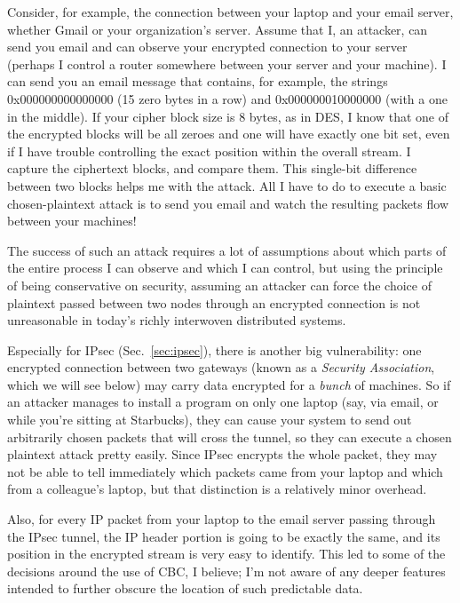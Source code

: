 \documentclass[%
 aip,
 jmp,%
 amsmath,amssymb,
 reprint,%
]{revtex4-1}
\begin{document}
Consider, for example, the connection between your laptop and your
email server, whether Gmail or your organization's server.  Assume
that I, an attacker, can send you email and can observe your encrypted
connection to your server (perhaps I control a router somewhere
between your server and your machine).  I can send you an email
message that contains, for example, the strings 0x000000000000000 (15
zero bytes in a row) and 0x000000010000000 (with a one in the middle).
If your cipher block size is 8 bytes, as in DES, I know that one of
the encrypted blocks will be all zeroes and one will have exactly one
bit set, even if I have trouble controlling the exact position within
the overall stream.  I capture the ciphertext blocks, and compare
them.  This single-bit difference between two blocks helps me with the
attack.  All I have to do to execute a basic chosen-plaintext attack
is to send you email and watch the resulting packets flow between your
machines!

The success of such an attack requires a lot of assumptions about
which parts of the entire process I can observe and which I can
control, but using the principle of being conservative on security,
assuming an attacker can force the choice of plaintext passed between
two nodes through an encrypted connection is not unreasonable in
today's richly interwoven distributed systems.

Especially for IPsec (Sec.~\ref{sec:ipsec}), there is another big
vulnerability: one encrypted connection between two gateways (known as
a \emph{Security Association}, which we will see below) may carry data
encrypted for a \emph{bunch} of machines.  So if an attacker manages
to install a program on only one laptop (say, via email, or while
you're sitting at Starbucks), they can cause your system to send out
arbitrarily chosen packets that will cross the tunnel, so they can
execute a chosen plaintext attack pretty easily.  Since IPsec encrypts
the whole packet, they may not be able to tell immediately which
packets came from your laptop and which from a colleague's laptop, but
that distinction is a relatively minor overhead.

Also, for every IP packet from your laptop to the email server passing
through the IPsec tunnel, the IP header portion is going to be exactly
the same, and its position in the encrypted stream is very easy to
identify.  This led to some of the decisions around the use of CBC, I
believe; I'm not aware of any deeper features intended to further
obscure the location of such predictable data.
\end{document}
